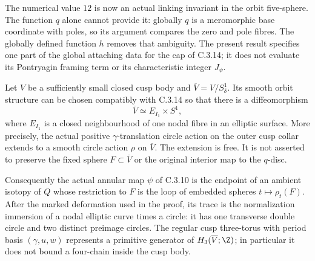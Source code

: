 \begin{remark}[Scope]
The numerical value $12$ is now an actual linking invariant in the
orbit five-sphere. The function $q$ alone cannot provide it: globally
$q$ is a meromorphic base coordinate with poles, so its argument
compares the zero and pole fibres. The globally defined function $h$
removes that ambiguity. The present result specifies one part of the
global attaching data for the cap of C.3.14; it does not evaluate its
Pontryagin framing term or its characteristic integer $J_\psi$.
\end{remark}
\begin{proposition}
Let $V$ be a sufficiently small closed cusp body and
$\overline V=V/S^1_\delta$. Its smooth orbit structure can be
chosen compatibly with C.3.14 so that there is a diffeomorphism
\[
 \overline V\simeq E_{I_1}\times S^1,
\]
where $E_{I_1}$ is a closed neighbourhood of one nodal fibre in
an elliptic surface. More precisely, the actual positive
$\gamma$-translation circle action on the outer cusp collar
extends to a smooth circle action $\rho$ on $\overline V$.
The extension is free. It is not asserted to preserve the
fixed sphere $F\subset\overline V$ or the original interior
map to the $q$-disc.

Consequently the actual annular map $\psi$ of C.3.10 is the
endpoint of an ambient isotopy of $Q$ whose restriction to $F$
is the loop of embedded spheres $t\mapsto\rho_t(F)$.
After the marked deformation used in the proof, its trace is
the normalization immersion of a nodal elliptic curve times a
circle: it has one transverse double circle and two distinct
preimage circles. The regular cusp three-torus with period
basis $(\gamma,u,w)$ represents a primitive generator of
$H_3(\overline V;\Z)$; in particular it does not bound a
four-chain inside the cusp body.
\end{proposition}
